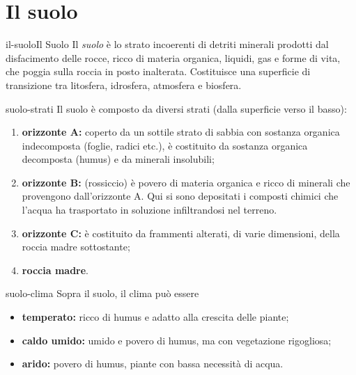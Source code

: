 \documentclass[preview]{standalone}
\begin{document}
\genpage

\section{Il suolo}

\begin{snippetdefinition}{il-suolo}{Il Suolo}
    Il \textit{suolo} è lo strato incoerenti di detriti minerali prodotti dal disfacimento delle rocce,
    ricco di materia organica, liquidi, gas e forme di vita, che poggia sulla roccia
    in posto inalterata. Costituisce una superficie di transizione tra litosfera,
    idrosfera, atmosfera e biosfera.
\end{snippetdefinition}

\begin{snippet}{suolo-strati}
    Il suolo è composto da diversi strati (dalla superficie verso il basso):
    \begin{enumerate}
        \item \textbf{orizzonte A:} coperto da un sottile
            strato di sabbia con sostanza organica indecomposta (foglie, radici etc.),
            è costituito da sostanza organica decomposta (humus) e da minerali insolubili;
        \item \textbf{orizzonte B:} (rossiccio) è povero di materia organica e ricco di minerali che provengono
            dall'orizzonte A. Qui si sono depositati i composti chimici che l'acqua ha trasportato in soluzione infiltrandosi nel terreno.
        \item \textbf{orizzonte C:} è costituito da frammenti alterati, di varie dimensioni, della roccia madre sottostante;
        \item \textbf{roccia madre}.
    \end{enumerate}
\end{snippet}

\begin{snippet}{suolo-clima}
    Sopra il suolo, il clima può essere
    \begin{itemize}
        \item \textbf{temperato:} ricco di humus e adatto alla crescita delle piante;
        \item \textbf{caldo umido:} umido e povero di humus, ma con vegetazione rigogliosa;
        \item \textbf{arido:} povero di humus, piante con bassa necessità di acqua.
    \end{itemize}
\end{snippet}
\end{document}
